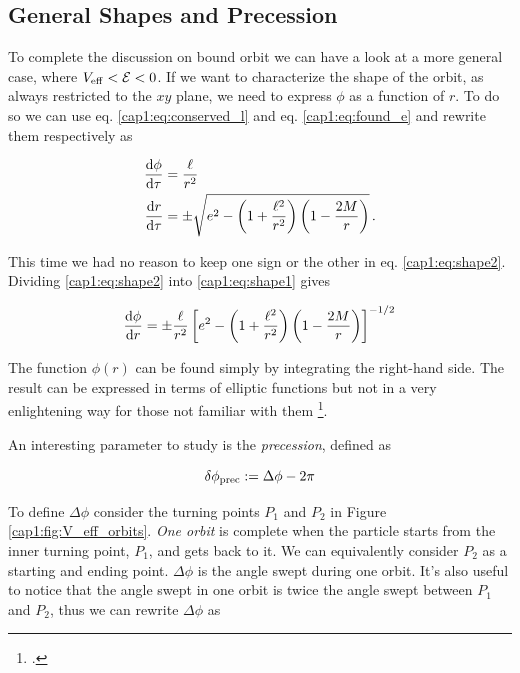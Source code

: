 \subsection{General Shapes and Precession}
\label{cap1:sec:precession}

To complete the discussion on bound orbit we can have a look at a more general
case, where $V_{\rm eff} < \mathcal E < 0$.
If we want to characterize the shape of the orbit, as always restricted to the
$xy$ plane, we need to express $\phi$ as a function of $r$.
To do so we can use eq. \ref{cap1:eq:conserved_l} and eq. \ref{cap1:eq:found_e}
and rewrite them respectively as

\begin{subequations}
\begin{align}
    \dv{\phi}{\tau} &= \frac{\ell}{r^2} \label{cap1:eq:shape1} \\
    \dv{r}{\tau} &= \pm \sqrt{e^2 - \left(1 + \frac{\ell^2}{r^2}\right)
    \left(1 - \frac{2M}{r}\right)} \label{cap1:eq:shape2} \, .
\end{align}
\label{cap1:eq:to_find_shape}
\end{subequations}

This time we had no reason to keep one sign or the other in eq.
\ref{cap1:eq:shape2}.
Dividing \ref{cap1:eq:shape2} into \ref{cap1:eq:shape1} gives

\begin{equation}
    \dv{\phi}{r} = \pm \frac{\ell}{r^2}
    \left[e^2 - \left(1 + \frac{\ell^2}{r^2}\right)
    \left(1 - \frac{2M}{r}\right)\right]^{-1/2}
    \label{cap1:eq:shape}
\end{equation}

The function $\phi(r)$ can be found simply by integrating the right-hand side.
The result can be expressed in terms of elliptic functions but not in a very
enlightening way for those not familiar with them
\footcite[page 202]{hartle2021gravity}.

An interesting parameter to study is the \textit{precession}, defined as

\begin{equation}
    \delta \phi_{\rm prec} := \Delta \phi - 2 \pi
    \label{cap1:eq:precession}
\end{equation}

To define $\Delta \phi$ consider the turning points $P_1$ and $P_2$ in Figure
\ref{cap1:fig:V_eff_orbits}.
\textit{One orbit} is complete when the particle starts from the inner turning
point, $P_1$, and gets back to it.
We can equivalently consider $P_2$ as a starting and ending point.
$\Delta \phi$ is the angle swept during one orbit.
It's also useful to notice that the angle swept in one orbit is twice the angle
swept between $P_1$ and $P_2$, thus we can rewrite $\Delta \phi$ as

